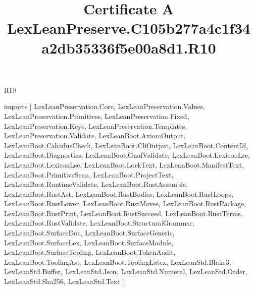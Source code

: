 \begin{lexlean}{R10}
\title{Certificate A LexLeanPreserve.C105b277a4c1f34a2db35336f5e00a8d1.R10}
\begin{coremodule}
imports [
  LexLeanPreservation.Core,
  LexLeanPreservation.Values,
  LexLeanPreservation.Primitives,
  LexLeanPreservation.Fixed,
  LexLeanPreservation.Keys,
  LexLeanPreservation.Templates,
  LexLeanPreservation.Validate,
  LexLeanBoot.AxiomOutput,
  LexLeanBoot.CalculusCheck,
  LexLeanBoot.CliOutput,
  LexLeanBoot.ContentId,
  LexLeanBoot.Diagnostics,
  LexLeanBoot.GnafValidate,
  LexLeanBoot.LexiconLre,
  LexLeanBoot.LexiconLse,
  LexLeanBoot.LockText,
  LexLeanBoot.ManifestText,
  LexLeanBoot.PrimitiveScan,
  LexLeanBoot.ProjectText,
  LexLeanBoot.RuntimeValidate,
  LexLeanBoot.RustAssemble,
  LexLeanBoot.RustAst,
  LexLeanBoot.RustBodies,
  LexLeanBoot.RustLoops,
  LexLeanBoot.RustLower,
  LexLeanBoot.RustMoves,
  LexLeanBoot.RustPackage,
  LexLeanBoot.RustPrint,
  LexLeanBoot.RustSucceed,
  LexLeanBoot.RustTerms,
  LexLeanBoot.RustValidate,
  LexLeanBoot.StructuralGrammar,
  LexLeanBoot.SurfaceDoc,
  LexLeanBoot.SurfaceGeneric,
  LexLeanBoot.SurfaceLex,
  LexLeanBoot.SurfaceModule,
  LexLeanBoot.SurfaceTooling,
  LexLeanBoot.TokenAudit,
  LexLeanBoot.ToolingAst,
  LexLeanBoot.ToolingLatex,
  LexLeanStd.Blake3,
  LexLeanStd.Buffer,
  LexLeanStd.Json,
  LexLeanStd.Numeral,
  LexLeanStd.Order,
  LexLeanStd.Sha256,
  LexLeanStd.Text
]


\end{coremodule}
\end{lexlean}
